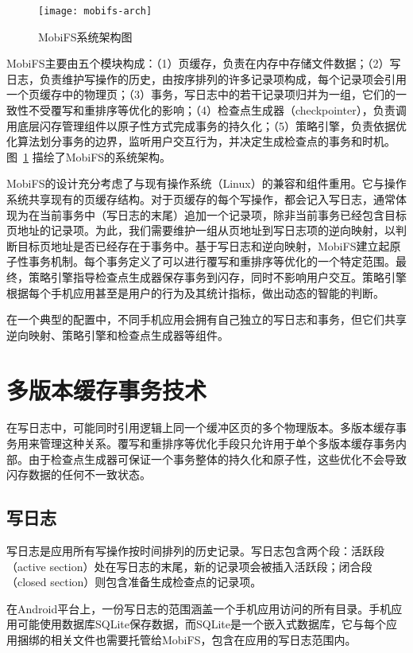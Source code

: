 \begin{figure}
  \centering
  \texttt{[image: mobifs-arch]}
  \caption{MobiFS系统架构图}
  \label{fig:mobifs-arch}
\end{figure}

MobiFS主要由五个模块构成：（1）页缓存，负责在内存中存储文件数据；（2）写日志，负责维护写操作的历史，由按序排列的许多记录项构成，每个记录项会引用一个页缓存中的物理页；（3）事务，写日志中的若干记录项归并为一组，它们的一致性不受覆写和重排序等优化的影响；（4）检查点生成器（checkpointer），负责调用底层闪存管理组件以原子性方式完成事务的持久化；（5）策略引擎，负责依据优化算法划分事务的边界，监听用户交互行为，并决定生成检查点的事务和时机。图~\ref{fig:mobifs-arch} 描绘了MobiFS的系统架构。

MobiFS的设计充分考虑了与现有操作系统（Linux）的兼容和组件重用。它与操作系统共享现有的页缓存结构。对于页缓存的每个写操作，都会记入写日志，通常体现为在当前事务中（写日志的末尾）追加一个记录项，除非当前事务已经包含目标页地址的记录项。为此，我们需要维护一组从页地址到写日志项的逆向映射，以判断目标页地址是否已经存在于事务中。基于写日志和逆向映射，MobiFS建立起原子性事务机制。每个事务定义了可以进行覆写和重排序等优化的一个特定范围。最终，策略引擎指导检查点生成器保存事务到闪存，同时不影响用户交互。策略引擎根据每个手机应用甚至是用户的行为及其统计指标，做出动态的智能的判断。

在一个典型的配置中，不同手机应用会拥有自己独立的写日志和事务，但它们共享逆向映射、策略引擎和检查点生成器等组件。

\section{多版本缓存事务技术}

在写日志中，可能同时引用逻辑上同一个缓冲区页的多个物理版本。多版本缓存事务用来管理这种关系。覆写和重排序等优化手段只允许用于单个多版本缓存事务内部。由于检查点生成器可保证一个事务整体的持久化和原子性，这些优化不会导致闪存数据的任何不一致状态。

\subsection{写日志}

写日志是应用所有写操作按时间排列的历史记录。写日志包含两个段：活跃段（active section）处在写日志的末尾，新的记录项会被插入活跃段；闭合段（closed section）则包含准备生成检查点的记录项。 
 
在Android平台上，一份写日志的范围涵盖一个手机应用访问的所有目录。手机应用可能使用数据库SQLite保存数据，而SQLite是一个嵌入式数据库，它与每个应用捆绑的相关文件也需要托管给MobiFS，包含在应用的写日志范围内。
 
